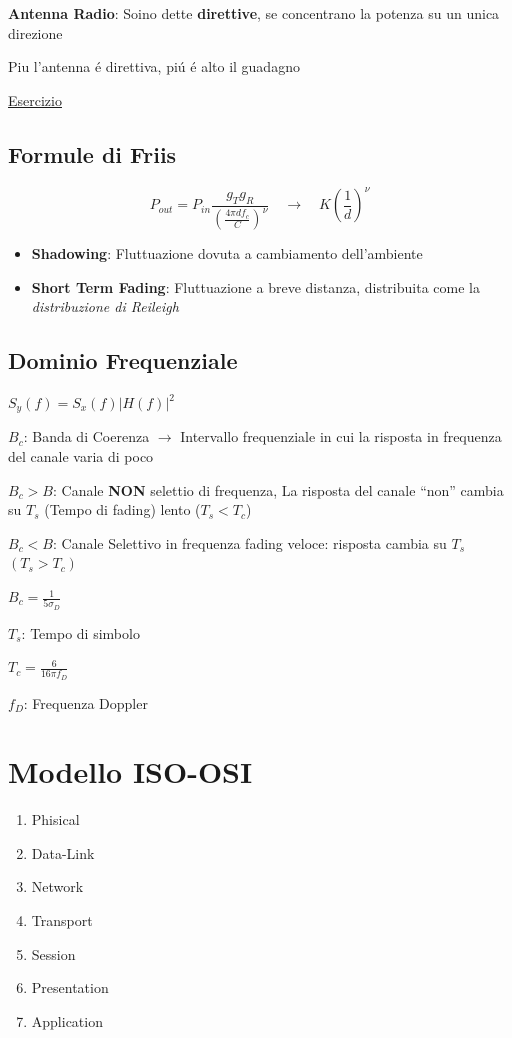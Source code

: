 \documentclass{article}
\begin{document}
\textbf{Antenna Radio}: Soino dette \textbf{direttive}, se concentrano la potenza su un unica direzione

Piu l'antenna \'e direttiva, pi\'u \'e alto il guadagno

\underline{Esercizio}

\subsection{Formule di Friis}

\[
    P_{out} = P_{in} \frac{g_T g_R}{{(\frac{4 \pi d f_c} {C})}^\nu} \quad \rightarrow  \quad K{\left(\frac{1}{d}\right)}^\nu
\]


\begin{itemize}
    \item \textbf{Shadowing}: Fluttuazione dovuta a cambiamento dell'ambiente
    \item \textbf{Short Term Fading}: Fluttuazione a breve distanza, distribuita come la \textit{distribuzione di Reileigh}
\end{itemize}

\subsection{Dominio Frequenziale}

$S_y(f) =S_x(f) {\lvert H(f) \rvert}^2$

$B_c$: Banda di Coerenza $\rightarrow$
Intervallo frequenziale in cui la risposta  in frequenza del canale varia di poco

$B_c > B$: Canale \textbf{NON} selettio di frequenza, La risposta del canale ``non'' cambia su $T_s$ (Tempo di fading) lento ($T_s < T_c$)


$B_c < B$: Canale Selettivo in frequenza
fading veloce: risposta cambia su $T_s$ $(T_s > T_c)$


$B_c = \frac{1}{5\sigma_D}$

$T_s$: Tempo di simbolo

$T_c = \frac{6}{16\pi f_D}$

$f_D$: Frequenza Doppler

\newpage
\section{Modello ISO-OSI}

\begin{enumerate}
    \item Phisical
    \item Data-Link
    \item Network
    \item Transport
    \item Session
    \item Presentation
    \item Application
\end{enumerate}
\end{document}
